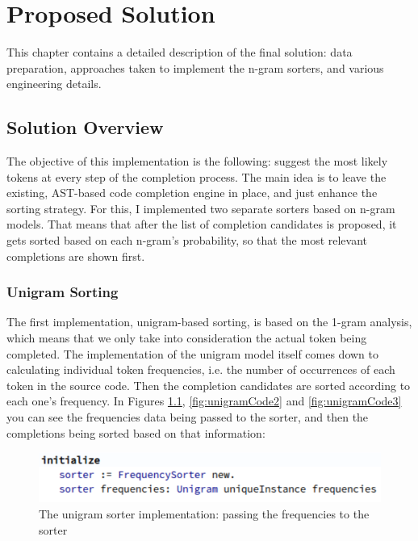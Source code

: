 \chapter{Proposed Solution}
\label{chap:ProposedSolution}

This chapter contains a detailed description of the final solution: data preparation, approaches taken to implement the n-gram sorters, and various engineering details.

\section{Solution Overview}
\label{sec:ProposedSolution-Overview}
The objective of this implementation is the following: suggest the most likely tokens at every step of the completion process. The main idea is to leave the existing, AST-based code completion engine in place, and just enhance the sorting strategy. For this, I implemented two separate sorters based on n-gram models. That means that after the list of completion candidates is proposed, it gets sorted based on each n-gram's probability, so that the most relevant completions are shown first.

\subsection{Unigram Sorting}
The first implementation, unigram-based sorting, is based on the 1-gram analysis, which means that we only take into consideration the actual token being completed. The implementation of the unigram model itself comes down to calculating individual token frequencies, i.e. the number of occurrences of each token in the source code. Then the completion candidates are sorted according to each one's frequency. In Figures \ref{fig:unigramCode1}, \ref{fig:unigramCode2} and \ref{fig:unigramCode3} you can see the frequencies data being passed to the sorter, and then the completions being sorted based on that information:

\begin{figure}[H]
    \centering
    \includegraphics[width=0.9\linewidth]{images/unigramCode1.png}
    \caption{The unigram sorter implementation: passing the frequencies to the sorter}
    \label{fig:unigramCode1}
\end{figure}


